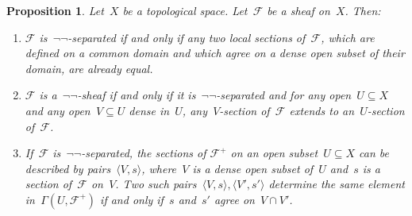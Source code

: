 \documentclass[10pt,reqno,a4paper]{amsbook}
\theoremstyle{definition}
\theoremstyle{plain}
\newtheorem{prop}[defn]{Proposition}
\theoremstyle{remark}
\newcommand{\F}{\mathcal{F}}
\newcommand{\?}{\,{:}\,}
\renewcommand{\_}{\mathpunct{.}\,}
\begin{document}
\begin{prop}\label{prop:negneg-sheaves}
Let~$X$ be a topological space. Let~$\F$ be a sheaf on~$X$. Then:
\begin{enumerate}
\item $\F$ is~$\neg\neg$-separated if and only if any two local sections
of~$\F$, which are defined on a common domain and which agree on a dense open
subset of their domain, are already equal.
\item $\F$ is a~$\neg\neg$-sheaf if and only if it is~$\neg\neg$-separated and
for any open~$U \subseteq X$ and any open~$V \subseteq U$ dense
in~$U$, any~$V$-section of~$\F$ extends to an~$U$-section of~$\F$.
\item If~$\F$ is~$\neg\neg$-separated, the sections of $\F^+$ on an open
subset~$U \subseteq X$ can be described by pairs~$\langle V,s \rangle$, where~$V$ is a dense
open subset of~$U$ and~$s$ is a section of~$\F$ on~$V$. Two such pairs~$\langle V,s \rangle,
\langle V',s' \rangle$ determine the same element in~$\Gamma(U,\F^+)$ if and only if~$s$ and~$s'$
agree on~$V \cap V'$.
\end{enumerate}
\end{prop}
\end{document}
